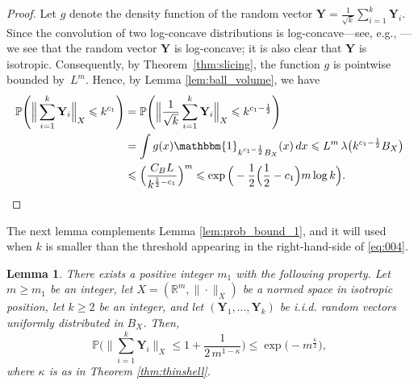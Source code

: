 \documentclass[11pt,leqno]{amsart}
\newtheorem{lemma}[theorem]{Lemma}
\theoremstyle{remark}
\theoremstyle{plain}
\begin{document}
\begin{proof}
Let $g$ denote the density function of the random vector $\mathbf{Y}=\frac{1}{\sqrt{k}}\sum_{i=1}^{k}\mathbf{Y}_i$. Since the convolution of two log-concave distributions is log-concave---see, e.g., \cite[Section 7.2]{Ga02}---we see that the random vector $\mathbf{Y}$ is log-concave; it is also clear that $\mathbf{Y}$ is isotropic. Consequently, by Theorem~\ref{thm:slicing}, the function $g$ is pointwise bounded by~$L^m$. Hence, by Lemma \ref{lem:ball_volume}, we have
\begin{align} \label{eq3.2}
\mathbb{P} \Bigg( \Big\|  \sum_{i=1}^{k} \mathbf{Y}_i \Big\|_X \leqslant k^{c_1} \Bigg) & =
\mathbb{P} \Bigg( \Big\| \frac{1}{\sqrt{k}} \sum_{i=1}^{k} \mathbf{Y}_i \Big\|_X \leqslant k^{c_1-\frac{1}{2}} \Bigg) \\
& = \int g(x) \mathbbm{1}_{k^{c_1-\frac{1}{2}}B_X}(x)\, dx
\leqslant L^m\, \lambda\big(k^{c_1-\frac{1}{2}} B_X\big) \nonumber \\
& \leqslant \Big(\frac{C_B L}{k^{\frac{1}{2}-c_1}}\Big)^m \leqslant
\exp\Big(-\frac{1}{2} \Big(\frac{1}{2}-c_1\Big)m \log k \Big). \nonumber \qedhere
\end{align}
\end{proof}

The next lemma complements Lemma \ref{lem:prob_bound_1}, and it will used when $k$ is smaller than the threshold appearing in the right-hand-side of \eqref{eq:004}.

\begin{lemma} \label{lem:prob_bound_2}
There exists a positive integer $m_1$ with the following property. Let $m\geqslant m_1$ be an integer, let $X=(\mathbb{R}^m,\|\cdot\|_X)$ be a normed space in isotropic position, let $k\geqslant 2$ be an integer, and let $(\mathbf{Y}_1,\dots,\mathbf{Y}_k)$ be i.i.d. random vectors uniformly distributed in $B_X$. Then,
\begin{equation} \label{eq3.4}
\mathbb{P} \Bigg( \Big\|  \sum_{i=1}^{k} \mathbf{Y}_i \Big\|_X \leqslant 1+\frac{1}{2\,m^{1-\kappa}} \Bigg)
\leqslant \exp\big(-m^{\frac{\kappa}{2}}\big),
\end{equation}
where $\kappa$ is as in Theorem \ref{thm:thinshell}.
\end{lemma}
\end{document}
